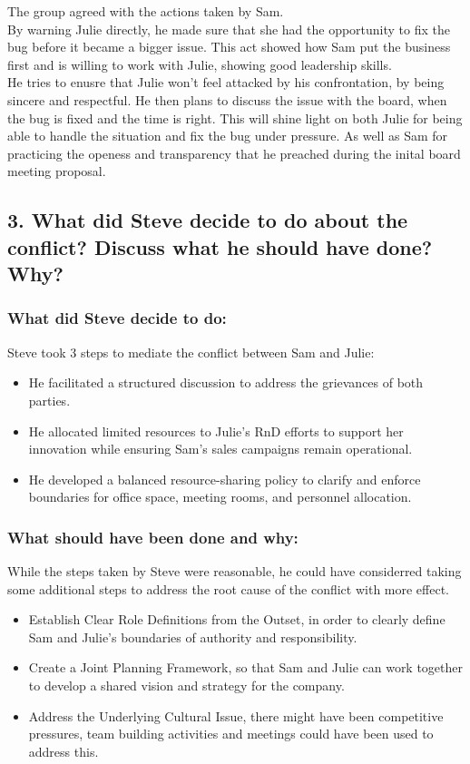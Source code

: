 \documentclass[a4paper,10pt]{article}
\begin{document}
The group agreed with the actions taken by Sam. \\
By warning Julie directly, he made sure that she had the opportunity to fix the bug before it became a bigger issue. This act showed how Sam put the business first and is willing to work with Julie, showing good leadership skills.\\

He tries to enusre that Julie won't feel attacked by his confrontation, by being sincere and respectful. He then plans to discuss the issue with the board, when the bug is fixed and the time is right. This will shine light on both Julie for being able to handle the situation and fix the bug under pressure. As well as Sam for practicing the openess and transparency that he preached during the inital board meeting proposal.\\


\subsection{3. What did Steve decide to do about the conflict? Discuss what he should have done? Why?}

\subsubsection{What did Steve decide to do:}
Steve took 3 steps to mediate the conflict between Sam and Julie:

\begin{itemize}
    \item He facilitated a structured discussion to address the grievances of both parties.
    \item He allocated limited resources to Julie's RnD efforts to support her innovation while ensuring Sam's sales campaigns remain operational.
    \item He developed a balanced resource-sharing policy to clarify and enforce boundaries for office space, meeting rooms, and personnel allocation.
\end{itemize}

\subsubsection{What should have been done and why:}

While the steps taken by Steve were reasonable, he could have considerred taking some additional steps to address the root cause of the conflict with more effect.\\
\begin{itemize}
    \item Establish Clear Role Definitions from the Outset, in order to clearly define Sam and Julie's boundaries of authority and responsibility.
    \item Create a Joint Planning Framework, so that Sam and Julie can work together to develop a shared vision and strategy for the company.
    \item Address the Underlying Cultural Issue, there might have been competitive pressures, team building activities and meetings could have been used to address this.
\end{itemize}
\end{document}
